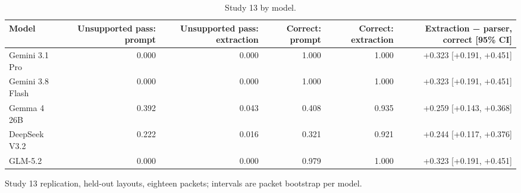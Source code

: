 \documentclass[10pt,twocolumn]{article}
\begin{document}
\begin{table}[t]
\centering\footnotesize\setlength{\tabcolsep}{4pt}
\caption{Study 13 by model.}
\label{tab:28}
\begin{adjustbox}{max width=\textwidth}
\begin{tabular}{lrrrrr}
\toprule
\textbf{Model} & \textbf{Unsupported pass: prompt} & \textbf{Unsupported pass: extraction} & \textbf{Correct: prompt} & \textbf{Correct: extraction} & \textbf{Extraction − parser, correct [95\% CI]} \\
\midrule
Gemini 3.1 Pro & 0.000 & 0.000 & 1.000 & 1.000 & +0.323 [+0.191, +0.451] \\
Gemini 3.8 Flash & 0.000 & 0.000 & 1.000 & 1.000 & +0.323 [+0.191, +0.451] \\
Gemma 4 26B & 0.392 & 0.043 & 0.408 & 0.935 & +0.259 [+0.143, +0.368] \\
DeepSeek V3.2 & 0.222 & 0.016 & 0.321 & 0.921 & +0.244 [+0.117, +0.376] \\
GLM-5.2 & 0.000 & 0.000 & 0.979 & 1.000 & +0.323 [+0.191, +0.451] \\
\bottomrule
\end{tabular}
\end{adjustbox}
\par\vspace{3pt}\begin{minipage}{\textwidth}\scriptsize Study 13 replication, held-out layouts, eighteen packets; intervals are packet bootstrap per model.\end{minipage}
\end{table}
\end{document}
